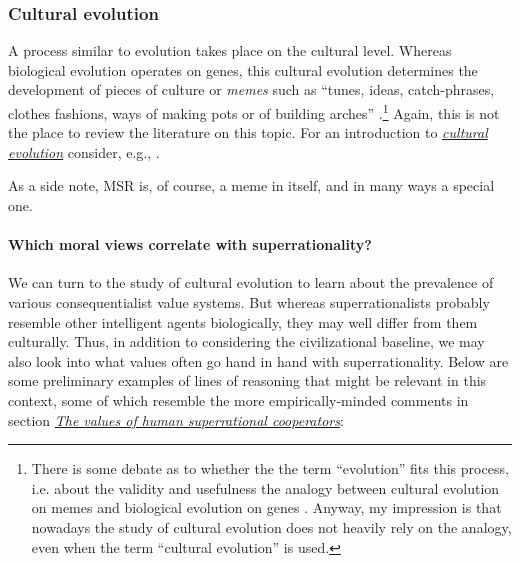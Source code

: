 \subsubsection{Cultural evolution}\label{cultural-evolution}

A process similar to evolution takes place on the cultural level.
Whereas biological evolution operates on genes, this cultural evolution
determines the development of pieces of culture or \emph{memes} such as
``tunes, ideas, catch-phrases, clothes fashions, ways of making pots or
of building arches'' \parencite{Dawkins1976-cd}.\footnote{There
  is some debate as to whether the the term ``evolution'' fits this
  process, i.e. about the validity and usefulness the analogy between
  cultural evolution on memes and biological evolution on genes
  \parencite{Edmonds2005-mi,Kuper_undated-zl,Gil-White2005-wt,Wimsatt1999-fy,Claidiere2012-gz,Atran2001-lb,Pinker1999-dd}.
  Anyway, my impression is that nowadays the study of cultural evolution
  does not heavily rely on the analogy, even when the term ``cultural
  evolution'' is used.} Again, this is not the place to review the
literature on this topic. For an introduction to
\href{https://en.wikipedia.org/wiki/Cultural_evolution}{\emph{cultural
evolution}} consider, e.g., \parencite{Henrich2015-xe}.

As a side note, MSR is, of course, a meme in itself, and in many ways a
special one.

\paragraph{Which moral views correlate with
superrationality?}\label{which-moral-views-correlate-with-superrationality}

We can turn to the study of cultural evolution to learn about the
prevalence of various consequentialist value systems. But whereas
superrationalists probably resemble other intelligent agents
biologically, they may well differ from them culturally. Thus, in
addition to considering the civilizational baseline, we may also look
into what values often go hand in hand with superrationality. Below are
some preliminary examples of lines of reasoning that might be relevant
in this context, some of which resemble the more empirically-minded
comments in section \protect\hyperlink{_ajbyis4djm7b}{\emph{The values
of human superrational cooperators}}:

